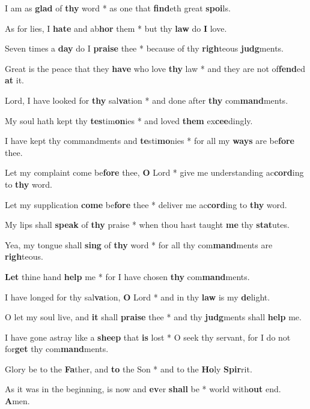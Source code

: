 \begin{multicols}{2}
	I am as \textbf{glad} of \textbf{thy} word * as one that \textbf{find}eth great \textbf{spoi}ls.
	
	As for lies, I \textbf{hate} and ab\textbf{hor} them * but thy \textbf{law} do \textbf{I} love.
	
	Seven times a \textbf{day} do I \textbf{praise} thee * because of thy \textbf{righ}teous \textbf{judg}ments.
	
	Great is the peace that they \textbf{have} who love \textbf{thy} law * and they are not of\textbf{fend}ed \textbf{at} it.
	
	Lord, I have looked for \textbf{thy} sal\textbf{va}tion * and done after \textbf{thy} com\textbf{mand}ments.
	
	My soul hath kept thy \textbf{tes}tim\textbf{on}ies * and loved \textbf{them} ex\textbf{cee}dingly.
	
	I have kept thy commandments and \textbf{te}sti\textbf{mo}nies * for all my \textbf{ways} are be\textbf{fore} thee.
	
	Let my complaint come be\textbf{fore} thee, \textbf{O} Lord * give me understanding ac\textbf{cord}ing to \textbf{thy} word.
	
	Let my supplication \textbf{come} be\textbf{fore} thee * deliver me ac\textbf{cord}ing to \textbf{thy} word.
	
	My lips shall \textbf{speak} of \textbf{thy} praise * when thou hast taught \textbf{me} thy \textbf{stat}utes.
	
	Yea, my tongue shall \textbf{sing} of \textbf{thy} word * for all thy com\textbf{mand}ments are \textbf{righ}teous.
	
	\textbf{Let} thine hand \textbf{help} me * for I have chosen \textbf{thy} com\textbf{mand}ments.
	
	I have longed for thy sal\textbf{va}tion, \textbf{O} Lord * and in thy \textbf{law} is my \textbf{de}light.
	
	O let my soul live, and \textbf{it} shall \textbf{praise} thee * and thy \textbf{judg}ments shall \textbf{help} me.
	
	I have gone astray like a \textbf{sheep} that \textbf{is} lost * O seek thy servant, for I do not for\textbf{get} thy com\textbf{mand}ments.
	
	Glory be to the \textbf{Fa}ther, and \textbf{to} the Son * and to the \textbf{Ho}ly \textbf{Spir}rit.
	
	As it was in the beginning, is now and \textbf{ev}er \textbf{shall} be * world with\textbf{out} end. \textbf{A}men.
\end{multicols}
